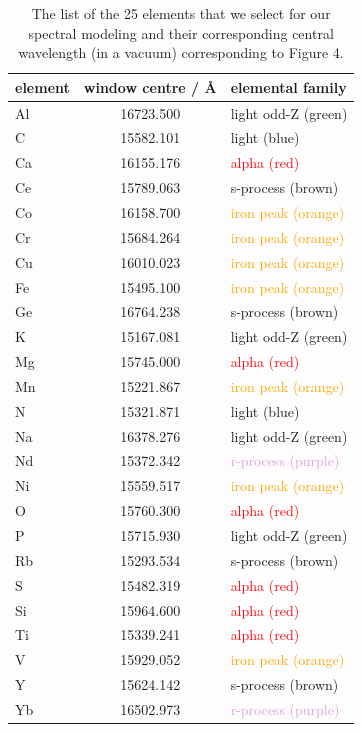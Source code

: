 \documentclass[a4paper,fleqn,usenatbib]{mnras}
\begin{document}
\begin{table}
    \centering
    \caption{The list of the 25 elements that we select for our spectral modeling and their corresponding central wavelength (in a vacuum) corresponding to Figure 4.}
    \label{tab:window_centres}
    \begin{tabular}{lcl}
        \hline
        element & window centre / \AA & elemental family \\
        \hline
        Al & 16723.500 & \textcolor{OliveGreen}{light odd-Z (green)} \\
        C & 15582.101 & \textcolor{NavyBlue}{light (blue)} \\
        Ca & 16155.176 & \textcolor{red}{alpha (red)} \\
        Ce & 15789.063 & \textcolor{Sepia}{s-process (brown)} \\
        Co & 16158.700 & \textcolor{orange}{iron peak (orange)} \\
        Cr & 15684.264 & \textcolor{orange}{iron peak (orange)} \\
        Cu & 16010.023 & \textcolor{orange}{iron peak (orange)} \\
        Fe & 15495.100 & \textcolor{orange}{iron peak (orange)} \\
        Ge & 16764.238 & \textcolor{Sepia}{s-process (brown)} \\
        K & 15167.081 & \textcolor{OliveGreen}{light odd-Z (green)} \\
        Mg & 15745.000 & \textcolor{red}{alpha (red)} \\
        Mn & 15221.867 & \textcolor{orange}{iron peak (orange)} \\
        N & 15321.871 & \textcolor{NavyBlue}{light (blue)} \\
        Na & 16378.276 & \textcolor{OliveGreen}{light odd-Z (green)} \\
        Nd & 15372.342 & \textcolor{Plum}{r-process (purple)} \\
        Ni & 15559.517 & \textcolor{orange}{iron peak (orange)} \\
        O & 15760.300 & \textcolor{red}{alpha (red)} \\
        P & 15715.930 & \textcolor{OliveGreen}{light odd-Z (green)} \\
        Rb & 15293.534 & \textcolor{Sepia}{s-process (brown)} \\
        S & 15482.319 & \textcolor{red}{alpha (red)} \\
        Si & 15964.600 & \textcolor{red}{alpha (red)} \\
        Ti & 15339.241 & \textcolor{red}{alpha (red)} \\
        V & 15929.052 & \textcolor{orange}{iron peak (orange)} \\
        Y & 15624.142 & \textcolor{Sepia}{s-process (brown)} \\
        Yb & 16502.973 & \textcolor{Plum}{r-process (purple)} \\
        \hline
    \end{tabular}
\end{table}
\end{document}
